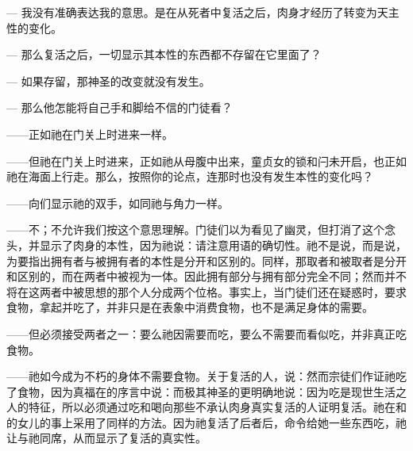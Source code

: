 — 我没有准确表达我的意思。是在从死者中复活之后，肉身才经历了转变为天主性的变化。\par

— 那么复活之后，一切显示其本性的东西都不存留在它里面了？\par

— 如果存留，那神圣的改变就没有发生。\par

— 那么他怎能将自己手和脚给不信的门徒看？\par

——正如祂在门关上时进来一样。\par

——但祂在门关上时进来，正如祂从母腹中出来，童贞女的锁和闩未开启，也正如祂在海面上行走。那么，按照你的论点，连那时也没有发生本性的变化吗？\par

——向们显示祂的双手，如同祂与角力一样。\par

——不；不允许我们按这个意思理解。门徒们以为看见了幽灵，但打消了这个念头，并显示了肉身的本性，因为祂说：请注意用语的确切性。祂不是说，而是说，为要指出拥有者与被拥有者的本性是分开和区别的。同样，那取者和被取者是分开和区别的，而在两者中被视为一体。因此拥有部分与拥有部分完全不同；然而并不将在这两者中被思想的那个人分成两个位格。事实上，当门徒们还在疑惑时，要求食物，拿起并吃了，并非只是在表象中消费食物，也不是满足身体的需要。\par

——但必须接受两者之一：要么祂因需要而吃，要么不需要而看似吃，并非真正吃食物。\par

——祂如今成为不朽的身体不需要食物。关于复活的人，说：然而宗徒们作证祂吃了食物，因为真福在的序言中说：而极其神圣的更明确地说：因为吃是现世生活之人的特征，所以必须通过吃和喝向那些不承认肉身真实复活的人证明复活。祂在和的女儿的事上采用了同样的方法。因为祂复活了后者后，命令给她一些东西吃，祂让与祂同席，从而显示了复活的真实性。\par

